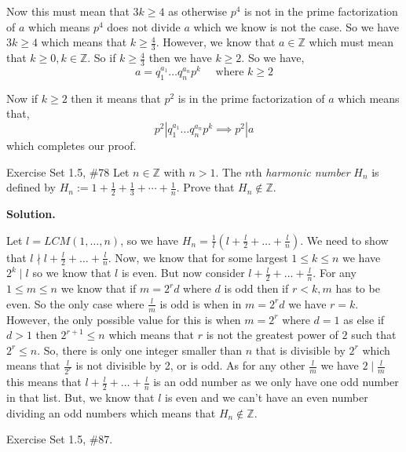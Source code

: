 \documentclass[12pt]{exam}
\begin{document}
\begin{questions}
\begin{parts}
Now this must mean that $3k \ge 4$ as otherwise  $p^{4}$ is not in the prime factorization of  $a$ which means $p^{4}$ does not divide $a$ which we know is not the case. So we have $3k \ge 4$ which means that  $k \ge \frac{4}{3}$. However, we know that $a \in \mathbb{Z}$ which must mean that  $k \ge 0, k \in \mathbb{Z}$. So if $k \ge \frac{4}{3}$ then we have $k \ge 2$. So we have,  
$$ a = q_1^{a_1}\dots q_n^{a_n} p^{k} \quad \text{ where $k \ge 2$} $$ 

Now if $k \ge 2 $ then it means that $p^2$ is in the prime factorization of $a$ which means that, 
$$ p^2 | q_1^{a_1}\dots q_n^{a_n} p^k \implies p^{2} | a $$  which completes our proof.

\end{parts}

\newpage
\question Exercise Set 1.5, \#78  
Let $n \in \mathbb{Z}$ with $n>1$. The $n$th \emph{harmonic number} $H_n$
is defined by $H_n:=1+\tfrac{1}{2}+\tfrac{1}{3}+\cdots+\tfrac{1}{n}$.
Prove that $H_n \not \in \mathbb{Z}$.


\textbf{Solution.} 

Let $l = LCM(1, \dots, n)$, so we have  $H_n = \frac{1}{l} (l + \frac{l}{2} + \dots + \frac{l}{n})$. We need to show that $l \nmid l + \frac{l}{2} + \dots + \frac{l}{n}$. Now, we know that for some largest $1 \le k \le n$ we have $2^{k} \mid  l$ so we know that $l$ is even. But now consider $l + \frac{l}{2} + \dots + \frac{l}{n}$. For any $1 \le m \le n$ we know that if $m = 2^{r}d$ where $d$ is odd then  if  $r < k, m$ has to be even. So the only case where $\frac{l}{m}$ is odd is when in $m = 2^{r}d$ we have $r = k$. However, the only possible value for this is when $m = 2^{r}$ where $d = 1$ as else if $d > 1$ then $2^{r + 1} \le n$  which means that $r$ is not the greatest power of $2$ such that $2^{r} \le n$. So, there is only one integer smaller than $n$ that is divisible by $2^{r}$ which means that $\frac{l}{2^{r}}$ is not divisible by 2, or is odd. As for any other $\frac{l}{m}$ we have $2 \mid \frac{l}{m}$ this means that $l + \frac{l}{2} + \dots + \frac{l}{n}$ is an odd number as we only have one odd number in that list. But, we know that $l$ is even and we can't have an even number dividing an odd numbers which means that $H_n \not \in \mathbb{Z}$.



\newpage 
\question  Exercise Set 1.5, \#87.
\end{questions}
\end{document}
